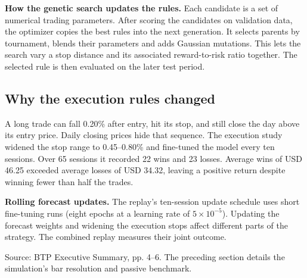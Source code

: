 \documentclass[12pt,a4paper,twoside,openany]{report}
\begin{document}
\textbf{How the genetic search updates the rules.} Each candidate is a set of numerical trading parameters. After scoring the candidates on validation data, the optimizer copies the best rules into the next generation. It selects parents by tournament, blends their parameters and adds Gaussian mutations. This lets the search vary a stop distance and its associated reward-to-risk ratio together. The selected rule is then evaluated on the later test period.

\subsection*{Why the execution rules changed}
A long trade can fall 0.20\% after entry, hit its stop, and still close the day above its entry price. Daily closing prices hide that sequence. The execution study widened the stop range to 0.45--0.80\% and fine-tuned the model every ten sessions. Over 65 sessions it recorded 22 wins and 23 losses. Average wins of USD 46.25 exceeded average losses of USD 34.32, leaving a positive return despite winning fewer than half the trades.\par
\textbf{Rolling forecast updates.} The replay's ten-session update schedule uses short fine-tuning runs (eight epochs at a learning rate of $5\times10^{-5}$). Updating the forecast weights and widening the execution stops affect different parts of the strategy. The combined replay measures their joint outcome.

Source: BTP Executive Summary, pp. 4--6. The preceding section details the simulation's bar resolution and passive benchmark.\par
\end{document}
